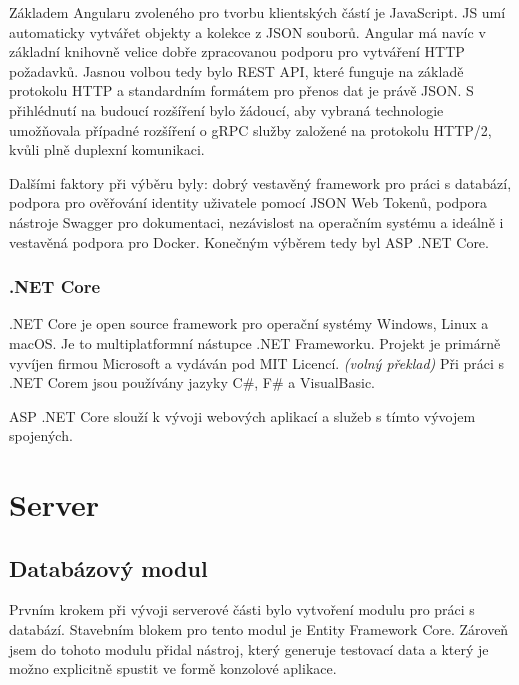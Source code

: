 \documentclass[
  biblatex,
  glossaries,
  index
]{kidiplom}
\begin{document}
Základem Angularu zvoleného pro tvorbu klientských částí je JavaScript. JS umí automaticky vytvářet objekty a kolekce z JSON souborů. Angular má navíc v základní knihovně velice dobře zpracovanou podporu pro vytváření HTTP požadavků. Jasnou volbou tedy bylo REST API, které funguje na základě protokolu HTTP a standardním formátem pro přenos dat je právě JSON. S přihlédnutí na budoucí rozšíření bylo žádoucí, aby vybraná technologie umožňovala případné rozšíření o gRPC služby založené na protokolu HTTP/2, kvůli plně duplexní komunikaci.

Dalšími faktory při výběru byly: dobrý vestavěný framework pro práci s databází, podpora pro ověřování identity uživatele pomocí JSON Web Tokenů, podpora nástroje Swagger pro dokumentaci, nezávislost na operačním systému a ideálně i vestavěná podpora pro Docker. Konečným výběrem tedy byl ASP .NET Core.

\subsubsection{.NET Core}
.NET Core je open source framework pro operační systémy Windows, Linux a macOS. Je to multiplatformní nástupce .NET Frameworku. Projekt je primárně vyvíjen firmou Microsoft a vydáván pod MIT Licencí. \cite{9} \textit{(volný překlad)} Při práci s .NET Corem jsou používány jazyky C\#, F\# a VisualBasic.

ASP .NET Core slouží k vývoji webových aplikací a služeb s tímto vývojem spojených.
\newpage
\section{Server}

\subsection{Databázový modul}
Prvním krokem při vývoji serverové části bylo vytvoření modulu pro práci s databází. Stavebním blokem pro tento modul je Entity Framework Core. Zároveň jsem do tohoto modulu přidal nástroj, který generuje testovací data a který je možno explicitně spustit ve formě konzolové aplikace.
\end{document}
